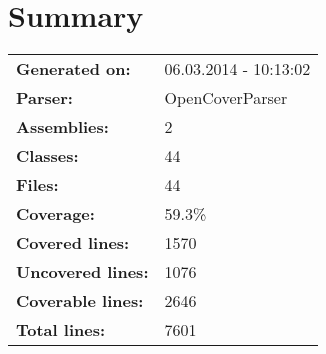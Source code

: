 \documentclass[a4paper,10pt]{article}
\begin{document}
\setcounter{secnumdepth}{-1}
\section{Summary}
\begin{longtable}[l]{ll}
\textbf{Generated on:} & 06.03.2014 - 10:13:02\\
\textbf{Parser:} & OpenCoverParser\\
\textbf{Assemblies:} & 2\\
\textbf{Classes:} & 44\\
\textbf{Files:} & 44\\
\textbf{Coverage:} & 59.3\%\\
\textbf{Covered lines:} & 1570\\
\textbf{Uncovered lines:} & 1076\\
\textbf{Coverable lines:} & 2646\\
\textbf{Total lines:} & 7601\\
\end{longtable}
\end{document}
